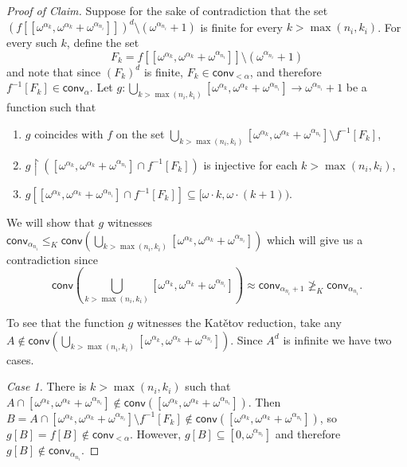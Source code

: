 \documentclass[10pt,a4paper]{amsart}
\newcommand{\conv}{\mathsf{conv}}
\renewcommand{\subset}{\subseteq}
\begin{document}
\begin{proof}[Proof of Claim]
Suppose for the sake of contradiction that the set $(f[[\omega^{\alpha_k},\omega^{\alpha_k}+\omega^{\alpha_{n_i}}]])^d\setminus (\omega^{\alpha_{n_i}}+1)$ is finite for every  $k>\max(n_i,k_i)$.
For every such $k$, define the set $$F_k=f[[\omega^{\alpha_k},\omega^{\alpha_k}+\omega^{\alpha_{n_i}}]]\setminus (\omega^{\alpha_{n_i}}+1)$$ and note that since $(F_k)^d$ is finite, $F_k\in\conv_{<\alpha}$, and therefore $f^{-1}[F_k]\in\conv_\alpha$.  Let $g: \bigcup_{k>\max(n_i,k_i)} [\omega^{\alpha_k},\omega^{\alpha_k}+\omega^{\alpha_{n_i}}]\to\omega^{\alpha_{n_i}}+1$ be a function such that 

\begin{enumerate}
    \item $g$ coincides with $f$ on the set
$\bigcup_{k>\max(n_i,k_i)} [\omega^{\alpha_k},
 \omega^{\alpha_k}+\omega^{\alpha_{n_i}}]\setminus f^{-1}[F_k]$,


 \item $g\restriction ([\omega^{\alpha_k},\omega^{\alpha_k}+\omega^{\alpha_{n_i}}]\cap f^{-1}[F_k])$ is injective for each $k>\max(n_i,k_i)$,
 \item $g[ [\omega^{\alpha_k},\omega^{\alpha_k}+\omega^{\alpha_{n_i}}]\cap f^{-1}[F_k]]\subset[\omega\cdot k, \omega\cdot (k+1)).$ 

 \end{enumerate}

We will show that $g $ witnesses $\conv_{\alpha_{n_i}}\leq_K \conv(\bigcup_{k>\max(n_i,k_i)} [\omega^{\alpha_k},\omega^{\alpha_k}+\omega^{\alpha_{n_i}}])$ which will give us a contradiction since 
$$\conv\left(\bigcup_{k>\max(n_i,k_i)} [\omega^{\alpha_k},\omega^{\alpha_k}+\omega^{\alpha_{n_i}}]\right) \approx \conv_{\alpha_{n_{i}}+1}\not\geq_K\conv_{\alpha_{n_i}}.$$

To see that the function $g$ witnesses the Kat\v{e}tov  reduction, take any $A\notin  \conv(\bigcup_{k>\max(n_i,k_i)} [\omega^{\alpha_k},\omega^{\alpha_k}+\omega^{\alpha_{n_i}}])$. Since $A^d$ is infinite we have two cases.

\emph{Case 1.} There is  $k>\max(n_i,k_i)$ such that $A\cap [\omega^{\alpha_k},\omega^{\alpha_k}+\omega^{\alpha_{n_i}}]\notin \conv([\omega^{\alpha_k},\omega^{\alpha_k}+\omega^{\alpha_{n_i}}])$. Then $B=A\cap [\omega^{\alpha_k},\omega^{\alpha_k}+\omega^{\alpha_{n_i}}]\setminus f^{-1} [F_k]\notin \conv([\omega^{\alpha_k},\omega^{\alpha_k}+\omega^{\alpha_{n_i}}]) $, so $g[B]=f[B]\notin \conv_{<\alpha}$. However, $g[B]\subset [0,\omega^{\alpha_{n_i}}]$ and therefore $g[B]\notin\conv_{\alpha_{n_i}}.$


\end{proof}
\end{document}
